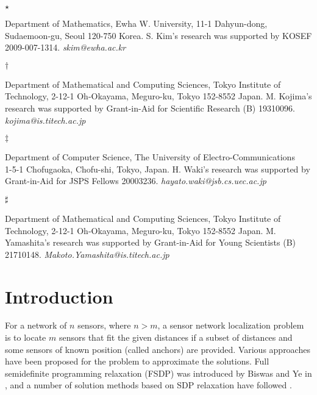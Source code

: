 \documentclass[12pt]{article}
\begin{document}
\vspace{0.5cm}

\noindent
\parbox[t]{0.5cm}{$\star$}
\parbox[t]{14.9cm}{Department of Mathematics, Ewha W. University,
11-1 Dahyun-dong, Sudaemoon-gu, Seoul 120-750 Korea.
 S. Kim's research was supported
by KOSEF 2009-007-1314.
{\it skim@ewha.ac.kr}
}

\medskip

\noindent
\parbox[t]{0.5cm}{$\dagger$}
\parbox[t]{14.9cm}{Department of Mathematical and Computing Sciences,
                      Tokyo Institute of Technology,
                      2-12-1 Oh-Okayama, Meguro-ku, Tokyo 152-8552 Japan.
                      M. Kojima's research was supported by Grant-in-Aid for
                                         Scientific Research (B) 19310096.
{\it kojima@is.titech.ac.jp}
}


\medskip

\noindent
\parbox[t]{0.5cm}{$\ddagger$}
\parbox[t]{14.9cm}{
Department of Computer Science,
    The University of Electro-Communications \\
        1-5-1 Chofugaoka, Chofu-shi, Tokyo, Japan. H. Waki's research was supported by
Grant-in-Aid for JSPS Fellows 20003236.  {\it
hayato.waki@jsb.cs.uec.ac.jp}
}

\medskip

\noindent
\parbox[t]{0.5cm}{$\sharp$}
\parbox[t]{14.9cm}{Department of Mathematical and Computing Sciences,
                      Tokyo Institute of Technology,
                      2-12-1 Oh-Okayama, Meguro-ku, Tokyo 152-8552 Japan.
                      M. Yamashita's research was supported by Grant-in-Aid for
                                        Young Scientists  (B) 21710148.
{\it Makoto.Yamashita@is.titech.ac.jp}
}


\newpage



\section{Introduction}


For a  network of $n$ sensors,  where $n >  m$,
a sensor network localization problem is to locate $m$ sensors that fit the given distances 
if a subset of distances and some sensors of known position (called anchors)
are provided. 
Various approaches 
\cite{ALFAKIH99,DOHERTY01,EREN04,GANESAN02,HOWARD01,TSENG07}
 have been proposed for the problem 
to approximate the solutions.  Full semidefinite programming relaxation (FSDP) 
 was introduced by Biswas and Ye in \cite{BISWAS04}, 
and  a number of solution methods based on SDP relaxation have followed
\cite{BISWAS06a,BISWAS06b,BISWAS06c,NIE06,WANG07}. 
\end{document}
